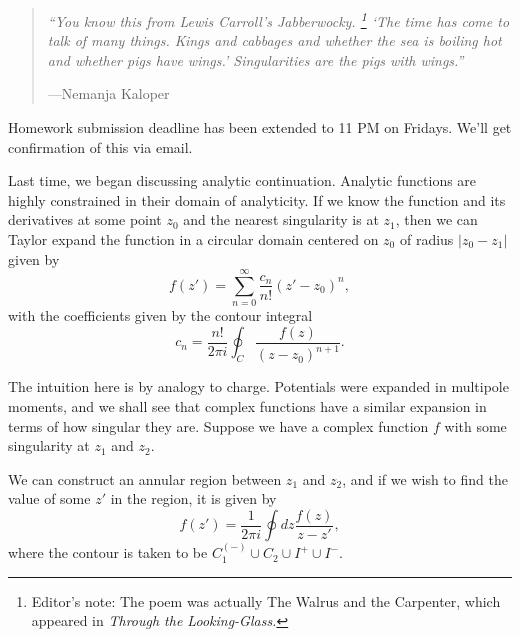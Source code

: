 \begin{quote}
    \textit{``You know this from Lewis Carroll's Jabberwocky.%
        \footnote{Editor's note: The poem was actually The Walrus and the Carpenter, which appeared in \textit{Through the Looking-Glass.}}
    `The time has come to talk of many things. Kings and cabbages and whether the sea is boiling hot and whether pigs have wings.' Singularities are the pigs with wings.''}
    
    ---Nemanja Kaloper
\end{quote}

\begin{note}
    Homework submission deadline has been extended to 11 PM on Fridays. We'll get confirmation of this via email.
\end{note}

Last time, we began discussing analytic continuation. Analytic functions are highly constrained in their domain of analyticity. If we know the function and its derivatives at some point $z_0$ and the nearest singularity is at $z_1$, then we can Taylor expand the function in a circular domain centered on $z_0$ of radius $|z_0-z_1|$ given by
\begin{equation}
    f(z') = \sum_{n=0}^\infty \frac{ c_n}{n!} (z'-z_0)^n,
\end{equation}
with the coefficients given by the contour integral
\begin{equation}
    c_n = \frac{n!}{2\pi i } \oint_C \frac{f(z)}{(z-z_0)^{n+1}}.
\end{equation}

The intuition here is by analogy to charge. Potentials were expanded in multipole moments, and we shall see that complex functions have a similar expansion in terms of how singular they are. Suppose we have a complex function $f$ with some singularity at $z_1$ and $z_2$. %

We can construct an annular region between $z_1$ and $z_2$, and if we wish to find the value of some $z'$ in the region, it is given by
\begin{equation}
    f(z') = \frac{1}{2\pi i} \oint dz \frac{f(z)}{z-z'},
\end{equation}
where the contour is taken to be $C_1^{(-)} \cup C_2 \cup I^+ \cup I^-$. %

